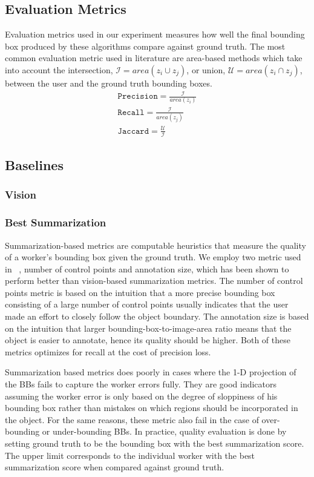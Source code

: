 \documentclass[letterpaper]{article} %
\begin{document}
\subsection{Evaluation Metrics}
 Evaluation metrics used in our experiment measures how well the final bounding box produced by these algorithms compare against ground truth. The most common evaluation metric used in literature are area-based methods which take into account the intersection, $\mathcal{I}=area(z_i\cup z_j)$, or union, $\mathcal{U}=area(z_i\cap z_j)$, between the user and the ground truth bounding boxes.
\begin{align}
\texttt{Precision} = \frac{\mathcal{I}}{area(z_i)} \\
\texttt{Recall} = \frac{\mathcal{I}}{area(z_j)} \\
\texttt{Jaccard} = \frac{\mathcal{U}}{\mathcal{I}}
\end{align}

\subsection{Baselines}

\subsubsection{Vision}
\subsubsection{Best Summarization}
\par Summarization-based metrics are computable heuristics that measure the quality of a worker's bounding box given the ground truth. We employ two metric used in ~\cite{Vittayakorn2011}, number of control points and annotation size, which has been shown to perform better than vision-based summarization metrics. The number of control points metric is based on the intuition that a more precise bounding box consisting of a large number of control points usually indicates that the user made an effort to closely follow the object boundary. The annotation size is based on the intuition that larger bounding-box-to-image-area ratio means that the object is easier to annotate, hence its quality should be higher.
Both of these metrics optimizes for recall at the cost of precision loss.
\par Summarization based metrics does poorly in cases where the 1-D projection of the BBs fails to capture the worker errors fully. They are good indicators assuming the worker error is only based on the degree of sloppiness of his bounding box rather than mistakes on which regions should be incorporated in the object. For the same reasons, these metric also fail in the case of over-bounding or under-bounding BBs. In practice, quality evaluation is done by setting ground truth to be the bounding box with the best summarization score. The upper limit corresponds to the individual worker with the best summarization score when compared against ground truth.
\end{document}
